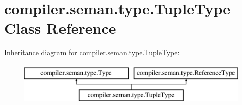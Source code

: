 \hypertarget{classcompiler_1_1seman_1_1type_1_1_tuple_type}{}\section{compiler.\+seman.\+type.\+Tuple\+Type Class Reference}
\label{classcompiler_1_1seman_1_1type_1_1_tuple_type}
Inheritance diagram for compiler.\+seman.\+type.\+Tuple\+Type\+:\begin{figure}[H]
\begin{center}
\leavevmode
\includegraphics[height=2.000000cm]{classcompiler_1_1seman_1_1type_1_1_tuple_type}
\end{center}
\end{figure}
